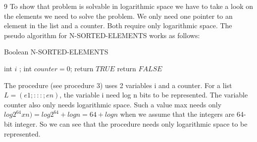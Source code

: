 \documentclass [11pt]{article}
\newcommand{\solution}[1]{\noindent {\bf Solution.}  #1}
\begin{document}
\solution{ 9}
To show that problem is solvable in logarithmic space we have to take a look on the elements we need to solve the problem. We only need one pointer to an element in the list and a counter. Both require only logarithmic space. The pseudo algorithm  for
N-SORTED-ELEMENTS works as follows:

\begin{algorithm}
\caption{Boolean N-SORTED-ELEMENTS }
\label{Bsort}
\begin{algorithmic}

 \State int $i$ ;
 \State int $counter = 0$;
     return $TRUE$
   \EndIf
  \EndIf
 \EndFor
 \State return $FALSE$
\EndFunction
\end{algorithmic}
\end{algorithm}

\medskip
The procedure (see procedure 3) uses 2 variables i  and a  counter. For a list $ L = (e1; : : : ; en) $,
the variable i need log n bits to be represented. The
variable counter also only needs logarithmic space. Such a value max needs only
$ log 2^64 x n) = log 2^64 + log n = 64 + log n$ when we assume that the integers are 64-bit integer.
So we can see that the procedure needs only logarithmic space to be represented.
\end{document}
